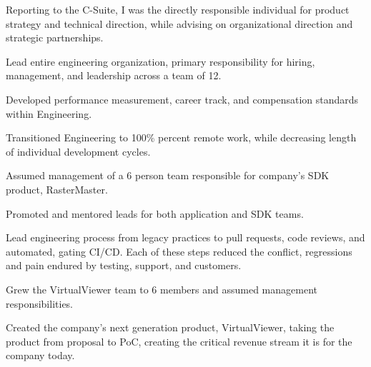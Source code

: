 \documentclass[letterpaper,10pt]{article}
\begin{document}
  \begin{resume_list}
    \item Reporting to the C-Suite, I was the directly responsible individual for product strategy and technical direction, while advising on organizational direction and strategic partnerships.
    \item Lead entire engineering organization, primary responsibility for hiring, management, and leadership across a team of 12.
    \item Developed performance measurement, career track, and compensation standards within Engineering.
    \item Transitioned Engineering to 100\% percent remote work, while decreasing length of individual development cycles.
  \end{resume_list}
     
  \begin{resume_list}
    \item Assumed management of a 6 person team responsible for company's SDK product, RasterMaster.
    \item Promoted and mentored leads for both application and SDK teams.
    \item Lead engineering process from legacy practices to pull requests, code reviews, and automated, gating CI/CD. Each of these steps reduced the conflict, regressions and pain endured by testing, support, and customers.
  \end{resume_list}

     
  \begin{resume_list}
    \item Grew the VirtualViewer team to 6 members and assumed management responsibilities.
  \end{resume_list}

  \begin{resume_list}
      \item Created the company's next generation product, VirtualViewer, taking the product from proposal to PoC, creating the critical revenue stream it is for the company today.
  \end{resume_list}
\end{document}
